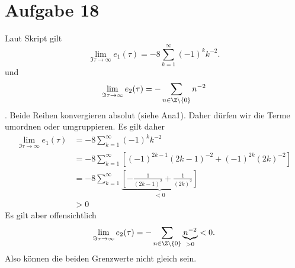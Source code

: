 \documentclass{article}
\begin{document}
  \section*{Aufgabe 18}
  Laut Skript gilt
  \begin{equation*}
    \lim\limits_{\Im \tau \to \infty} e_1(\tau) = -8 \sum_{k = 1}^{\infty} (-1)^kk^{-2}.
  \end{equation*}
  und
  \begin{equation*}
    \lim\limits_{\Im \tau \to \infty} e_2(\tau) = -\sum_{n \in \Z\setminus\{0\}} n^{-2}
  \end{equation*}.
  Beide Reihen konvergieren absolut (siehe Ana1). Daher dürfen wir die Terme umordnen oder umgruppieren. Es gilt daher
  \begin{align*}
    \lim\limits_{\Im \tau \to \infty} e_1(\tau) &= -8 \sum_{k = 1}^{\infty} (-1)^kk^{-2}\\
    &= -8 \sum_{k = 1}^{\infty} \left[(-1)^{2k-1}(2k-1)^{-2} + (-1)^{2k}(2k)^{-2}\right]\\
    &= -8 \sum_{k = 1}^{\infty} \underbrace{\left[- \frac{1}{(2k-1)^2} + \frac{1}{(2k)^2}\right]}_{< 0}\\
    &> 0
  \end{align*}
  Es gilt aber offensichtlich
  \begin{equation*}
    \lim\limits_{\Im \tau \to \infty} e_2(\tau) = -\sum_{n \in \Z\setminus\{0\}} \underbrace{n^{-2}}_{> 0} < 0 .
  \end{equation*}
  Also können die beiden Grenzwerte nicht gleich sein.
\end{document}
